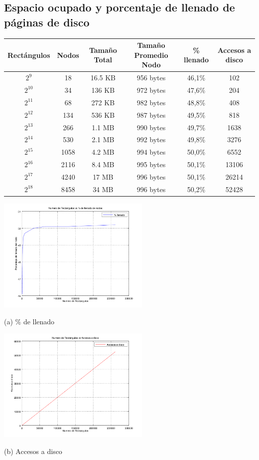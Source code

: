 \documentclass[letterpaper,10pt]{article}
\begin{document}
	\subsection{Espacio ocupado y porcentaje de llenado de páginas de disco}

	\begin{center}

		\begin{tabular}{|c|c|c|c|c|c|}
			\hline
			Rectángulos	& Nodos & Tamaño Total & Tamaño Promedio Nodo & \% llenado & Accesos a disco\\
			\hline
			$2^{9}$ 	& 18 & 16.5 KB & 956 bytes & 46,1\% & 102 \\
			\hline
			$2^{10}$ 	& 34 & 136 KB & 972 bytes & 47,6\% & 204 \\
			\hline
			$2^{11}$ 	& 68 & 272 KB & 982 bytes & 48,8\% & 408 \\
			\hline
			$2^{12}$ 	& 134 & 536 KB & 987 bytes & 49,5\% & 818 \\
			\hline
			$2^{13}$ 	& 266 & 1.1 MB & 990 bytes & 49,7\% & 1638 \\
			\hline
			$2^{14}$ 	& 530 & 2.1 MB & 992 bytes & 49,8\% & 3276 \\
			\hline
			$2^{15}$ 	& 1058 & 4.2 MB & 994 bytes & 50,0\% & 6552 \\
			\hline
			$2^{16}$ 	& 2116 & 8.4 MB & 995 bytes & 50,1\% & 13106 \\
			\hline
			$2^{17}$ 	& 4240 & 17 MB & 996 bytes & 50,1\% & 26214 \\
			\hline
			$2^{18}$ 	& 8458 & 34 MB & 996 bytes & 50,2\% & 52428 \\
			\hline
		\end{tabular}

		\includegraphics[width=0.55\textwidth]{fig2.png}

		(a) \% de llenado

		\includegraphics[width=0.55\textwidth]{fig4.png}

		(b) Accesos a disco


	\end{center}
\end{document}
